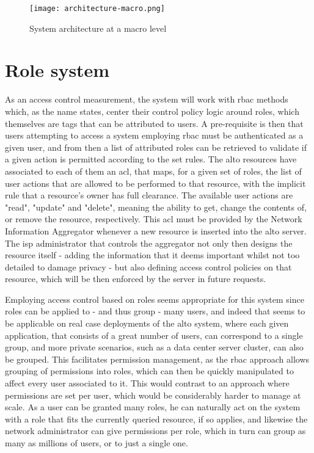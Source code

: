 \begin{figure}[H]
        \centering
        \hspace*{-4em}
        \texttt{[image: architecture-macro.png]}
        \caption{System architecture at a macro level}
        \label{fig:macro-architecture}
\end{figure}

\section{Role system}
\label{sec:system-roles}

    As an access control measurement, the system will work with \gls{rbac} methods which, as the name states, center their control policy logic around roles, which themselves are tags that can be attributed to users.
    A pre-requisite is then that users attempting to access a system employing \gls{rbac} must be authenticated as a given user, and from then a list of attributed roles can be retrieved to validate if a given action is permitted according to the set rules.
    The \gls{alto} resources have associated to each of them an \gls{acl}, that maps, for a given set of roles, the list of user actions that are allowed to be performed to that resource, with the implicit rule that a resource's owner has full clearance.
    The available user actions are "read", "update" and "delete", meaning the ability to get, change the contents of, or remove the resource, respectively.
    This \gls{acl} must be provided by the Network Information Aggregator whenever a new resource is inserted into the \gls{alto} server.
    The \gls{isp} administrator that controls the aggregator not only then designs the resource itself - adding the information that it deems important whilst not too detailed to damage privacy - but also defining access control policies on that resource, which will be then enforced by the server in future requests.

    Employing access control based on roles seems appropriate for this system since roles can be applied to - and thus group - many users, and indeed that seems to be applicable on real case deployments of the \gls{alto} system, where each given application, that consists of a great number of users, can correspond to a single group, and more private scenarios, such as a data center server cluster, can also be grouped.
    This facilitates permission management, as the \gls{rbac} approach allows grouping of permissions into roles, which can then be quickly manipulated to affect every user associated to it.
    This would contrast to an approach where permissions are set per user, which would be considerably harder to manage at scale.
    As a user can be granted many roles, he can naturally act on the system with a role that fits the currently queried resource, if so applies, and likewise the network administrator can give permissions per role, which in turn can group as many as millions of users, or to just a single one.

